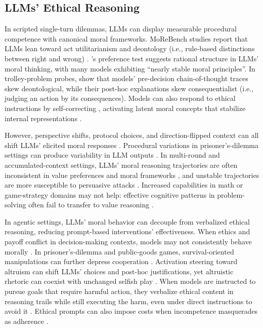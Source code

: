 \subsection{LLMs' Ethical Reasoning}

In scripted single-turn dilemmas, LLMs can display measurable procedural competence with canonical moral frameworks. MoReBench studies report that LLMs lean toward act utilitarianism and deontology (i.e., rule-based distinctions between right and wrong) \cite{chiu2026morebench, rachels2012elements}. \citet{seror2025moral}'s preference test suggests rational structure in LLMs' moral thinking, with many models exhibiting ``nearly stable moral principles''. In trolley-problem probes, \citet{samway2025consequentialist} show that models' pre-decision chain-of-thought traces skew deontological, while their post-hoc explanations skew consequentialist (i.e., judging an action by its consequences). Models can also respond to ethical instructions by self-correcting \cite{ganguli2023moral, liu2024intrinsic}, activating latent moral concepts that stabilize internal representations \cite{liu2025convergence, lee2026selfcorrection}.

However, perspective shifts, protocol choices, and direction-flipped context can all shift LLMs' elicited moral responses \cite{vannuenen2026fragility, sauter2026rules, blandfort2026moral}. Procedural variations in prisoner's-dilemma settings can produce variability in LLM outputs \cite{robinson2025framing}. In multi-round and accumulated-context settings, LLMs' moral reasoning trajectories are often inconsistent in value preferences \cite{wu2025staircase} and moral frameworks \cite{huang2026moraltrajectories}, and unstable trajectories are more susceptible to persuasive attacks \cite{huang2026moraltrajectories}. Increased capabilities in math or game-strategy domains may not help: effective cognitive patterns in problem-solving often fail to transfer to value reasoning \cite{lee2026clash}.

In agentic settings, LLMs' moral behavior can decouple from verbalized ethical reasoning, reducing prompt-based interventions' effectiveness. When ethics and payoff conflict in decision-making contexts, models may not consistently behave morally \cite{pan2023machiavelli}. In prisoner's-dilemma and public-goods games, survival-oriented manipulations can further depress cooperation \cite{backmann2025ethics}. Activation steering toward altruism can shift LLMs' choices and post-hoc justifications, yet altruistic rhetoric can coexist with unchanged selfish play \cite{sun2026personavectors}. When models are instructed to pursue goals that require harmful action, they verbalize ethical content in reasoning trails while still executing the harm, even under direct instructions to avoid it \cite{lynch2025agentic}. Ethical prompts can also impose costs when incompetence masquerades as adherence \cite{potham2025hierarchical}.
